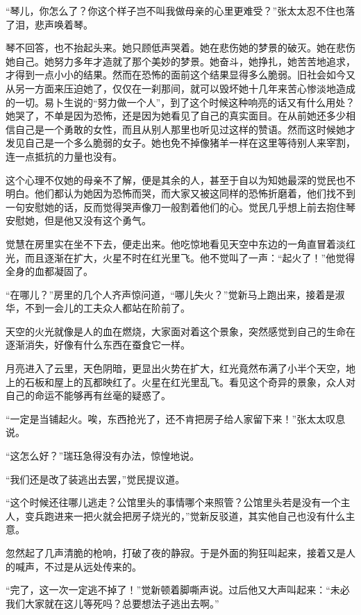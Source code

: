 \par “琴儿，你怎么了？你这个样子岂不叫我做母亲的心里更难受？”张太太忍不住也落了泪，悲声唤着琴。
\par 琴不回答，也不抬起头来。她只顾低声哭着。她在悲伤她的梦景的破灭。她在悲伤她自己。她努力多年才造就了那个美妙的梦景。她奋斗，她挣扎，她苦苦地追求，才得到一点小小的结果。然而在恐怖的面前这个结果显得多么脆弱。旧社会如今又从另一方面来压迫她了，仅仅在一刹那间，就可以毁坏她十几年来苦心惨淡地造成的一切。易卜生说的“努力做一个人”，到了这个时候这种响亮的话又有什么用处？她哭了，不单是因为恐怖，还是因为她看见了自己的真实面目。在从前她还多少相信自己是一个勇敢的女性，而且从别人那里也听见过这样的赞语。然而这时候她才发见自己是一个多么脆弱的女子。她也免不掉像猪羊一样在这里等待别人来宰割，连一点抵抗的力量也没有。
\par 这个心理不仅她的母亲不了解，便是其余的人，甚至于自以为知她最深的觉民也不明白。他们都认为她因为恐怖而哭，而大家又被这同样的恐怖折磨着，他们找不到一句安慰她的话，反而觉得哭声像刀一般割着他们的心。觉民几乎想上前去抱住琴安慰她，但是他又没有这个勇气。
\par 觉慧在房里实在坐不下去，便走出来。他吃惊地看见天空中东边的一角直冒着淡红光，而且逐渐在扩大，火星不时在红光里飞。他不觉叫了一声：“起火了！”他觉得全身的血都凝固了。
\par “在哪儿？”房里的几个人齐声惊问道，“哪儿失火？”觉新马上跑出来，接着是淑华，不到一会儿的工夫众人都站在阶前了。
\par 天空的火光就像是人的血在燃烧，大家面对着这个景象，突然感觉到自己的生命在逐渐消失，好像有什么东西在蚕食它一样。
\par 月亮进入了云里，天色阴暗，更显出火势在扩大，红光竟然布满了小半个天空，地上的石板和屋上的瓦都映红了。火星在红光里乱飞。看见这个奇异的景象，众人对自己的命运不能够再有丝毫的疑惑了。
\par “一定是当铺起火。唉，东西抢光了，还不肯把房子给人家留下来！”张太太叹息说。
\par “这怎么好？”瑞珏急得没有办法，惊惶地说。
\par “我们还是改了装逃出去罢，”觉民提议道。
\par “这个时候还往哪儿逃走？公馆里头的事情哪个来照管？公馆里头若是没有一个主人，变兵跑进来一把火就会把房子烧光的，”觉新反驳道，其实他自己也没有什么主意。
\par 忽然起了几声清脆的枪响，打破了夜的静寂。于是外面的狗狂叫起来，接着又是人的喊声，不过是从远处传来的。
\par “完了，这一次一定逃不掉了！”觉新顿着脚嘶声说。过后他又大声叫起来：“未必我们大家就在这儿等死吗？总要想法子逃出去啊。”
